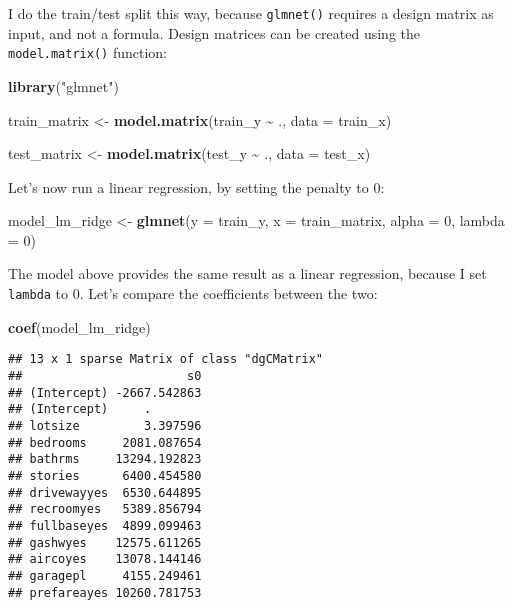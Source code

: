 \documentclass[
]{article}
\newenvironment{Shaded}{\begin{snugshade}}{\end{snugshade}}
\newcommand{\DataTypeTok}[1]{\textcolor[rgb]{0.13,0.29,0.53}{#1}}
\newcommand{\DecValTok}[1]{\textcolor[rgb]{0.00,0.00,0.81}{#1}}
\newcommand{\KeywordTok}[1]{\textcolor[rgb]{0.13,0.29,0.53}{\textbf{#1}}}
\newcommand{\NormalTok}[1]{#1}
\newcommand{\OperatorTok}[1]{\textcolor[rgb]{0.81,0.36,0.00}{\textbf{#1}}}
\newcommand{\StringTok}[1]{\textcolor[rgb]{0.31,0.60,0.02}{#1}}
\begin{document}
I do the train/test split this way, because \texttt{glmnet()} requires a design matrix as input, and not
a formula. Design matrices can be created using the \texttt{model.matrix()} function:

\begin{Shaded}
\begin{Highlighting}[]
\KeywordTok{library}\NormalTok{(}\StringTok{"glmnet"}\NormalTok{)}

\NormalTok{train\_matrix \textless{}{-}}\StringTok{ }\KeywordTok{model.matrix}\NormalTok{(train\_y }\OperatorTok{\textasciitilde{}}\StringTok{ }\NormalTok{., }\DataTypeTok{data =}\NormalTok{ train\_x)}

\NormalTok{test\_matrix \textless{}{-}}\StringTok{ }\KeywordTok{model.matrix}\NormalTok{(test\_y }\OperatorTok{\textasciitilde{}}\StringTok{ }\NormalTok{., }\DataTypeTok{data =}\NormalTok{ test\_x)}
\end{Highlighting}
\end{Shaded}

Let's now run a linear regression, by setting the penalty to 0:

\begin{Shaded}
\begin{Highlighting}[]
\NormalTok{model\_lm\_ridge \textless{}{-}}\StringTok{ }\KeywordTok{glmnet}\NormalTok{(}\DataTypeTok{y =}\NormalTok{ train\_y, }\DataTypeTok{x =}\NormalTok{ train\_matrix, }\DataTypeTok{alpha =} \DecValTok{0}\NormalTok{, }\DataTypeTok{lambda =} \DecValTok{0}\NormalTok{)}
\end{Highlighting}
\end{Shaded}

The model above provides the same result as a linear regression, because I set \texttt{lambda} to 0. Let's
compare the coefficients between the two:

\begin{Shaded}
\begin{Highlighting}[]
\KeywordTok{coef}\NormalTok{(model\_lm\_ridge)}
\end{Highlighting}
\end{Shaded}

\begin{verbatim}
## 13 x 1 sparse Matrix of class "dgCMatrix"
##                       s0
## (Intercept) -2667.542863
## (Intercept)     .       
## lotsize         3.397596
## bedrooms     2081.087654
## bathrms     13294.192823
## stories      6400.454580
## drivewayyes  6530.644895
## recroomyes   5389.856794
## fullbaseyes  4899.099463
## gashwyes    12575.611265
## aircoyes    13078.144146
## garagepl     4155.249461
## prefareayes 10260.781753
\end{verbatim}
\end{document}
